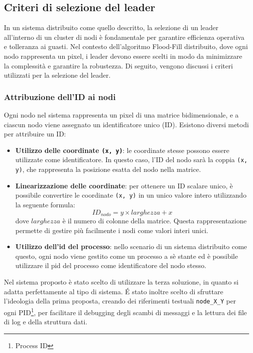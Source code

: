 \documentclass[12pt, a4paper]{report}
\begin{document}
\subsection{Criteri di selezione del leader}

In un sistema distribuito come quello descritto, la selezione di un leader all'interno di un cluster di nodi \`e fondamentale per garantire efficienza operativa e tolleranza ai guasti. Nel contesto dell'algoritmo Flood-Fill distribuito, dove ogni nodo rappresenta un pixel, i leader devono essere scelti in modo da minimizzare la complessit\`a e garantire la robustezza. Di seguito, vengono discussi i criteri utilizzati per la selezione del leader.

\subsubsection{Attribuzione dell'ID ai nodi}

Ogni nodo nel sistema rappresenta un pixel di una matrice bidimensionale, e a ciascun nodo viene assegnato un identificatore unico (ID). Esistono diversi metodi per attribuire un ID:

\begin{itemize}
    \item \textbf{Utilizzo delle coordinate \texttt{(x, y)}}: le coordinate stesse possono essere utilizzate come identificatore. In questo caso, l'ID del nodo sar\`a la coppia \texttt{(x, y)}, che rappresenta la posizione esatta del nodo nella matrice.
    
    \item \textbf{Linearizzazione delle coordinate}: per ottenere un ID scalare unico, \`e possibile convertire le coordinate \texttt{(x, y)} in un unico valore intero utilizzando la seguente formula:
    \[
    ID_{nodo} = y \times larghezza + x
    \]
    dove $larghezza$ \`e il numero di colonne della matrice. Questa rappresentazione permette di gestire pi\`u facilmente i nodi come valori interi unici.

    \item \textbf{Utilizzo dell'id del processo}: nello scenario di un sistema distribuito come questo, ogni nodo viene gestito come un processo a s\`e stante ed \`e possibile utilizzare il pid del processo come identificatore del nodo stesso.

\end{itemize}

Nel sistema proposto \`e stato scelto di utilizzare la terza soluzione, in quanto si adatta perfettamente al tipo di sistema. \'E stato inoltre scelto di sfruttare l'ideologia della prima proposta, creando dei riferimenti testuali \texttt{node\_X\_Y} per ogni PID\footnote{Process ID}, per facilitare il debugging degli scambi di messaggi e la lettura dei file di log e della struttura dati.
\end{document}
